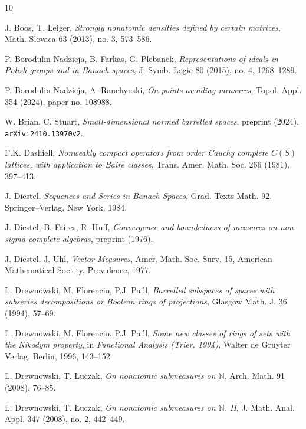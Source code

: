 \documentclass[a4paper,11pt,fleqn]{amsart}
\theoremstyle{definition}
\theoremstyle{remark}
\numberwithin{equation}{section}
\newcommand{\N}{\mathbb{N}}
\begin{document}
\begin{thebibliography}{10}

 J. Boos, T. Leiger, \textit{Strongly nonatomic densities defined by certain matrices}, Math. Slovaca 63 (2013), no. 3, 573--586.

 P. Borodulin-Nadzieja, B. Farkas, G. Plebanek, \textit{Representations of ideals in Polish groups and in Banach spaces}, J. Symb. Logic 80 (2015), no. 4, 1268--1289.

 P. Borodulin-Nadzieja, A. Ranchynski, \textit{On points avoiding measures}, Topol. Appl. 354 (2024), paper no. 108988.


 W. Brian, C. Stuart, \textit{Small-dimensional normed barrelled spaces}, preprint (2024), \texttt{arXiv:2410.13970v2}.

 F.K. Dashiell, \textit{Nonweakly compact operators from order Cauchy complete $C(S)$ lattices, with application to Baire classes}, Trans. Amer. Math. Soc. 266 (1981), 397--413.

 J. Diestel, \textit{Sequences and Series in Banach Spaces}, Grad. Texts Math. 92, Springer--Verlag, New York, 1984.

 J. Diestel, B. Faires, R. Huff, \textit{Convergence and boundedness of measures on non-sigma-complete algebras}, preprint (1976).

 J. Diestel, J. Uhl, \textit{Vector Measures}, Amer. Math. Soc. Surv. 15, American Mathematical Society, Providence, 1977.

 L. Drewnowski, M. Florencio, P.J. Pa\'ul, \textit{Barrelled
subspaces of spaces with subseries decompositions or
Boolean rings of projections}, Glasgow Math. J. 36 (1994), 57--69.

 L. Drewnowski, M. Florencio, P.J. Pa\'ul, \textit{Some
new classes of rings of sets with the Nikodym property}, in \textit{Functional Analysis (Trier, 1994)}, Walter de Gruyter Verlag, Berlin, 1996, 143--152.

 L. Drewnowski, T. \L uczak, \textit{On nonatomic submeasures on $\N$}, Arch. Math. 91 (2008), 76--85.

 L. Drewnowski, T. \L uczak, \textit{On nonatomic submeasures on $\N$. II}, J. Math. Anal. Appl. 347 (2008), no. 2, 442--449.


\end{thebibliography}
\end{document}
